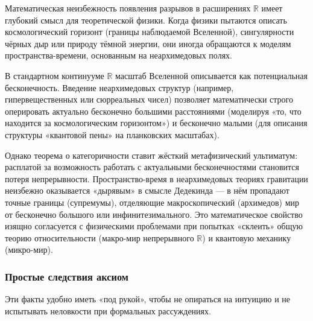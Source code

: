 \documentclass[11pt, a4paper]{extarticle}
\newcommand{\R}{{\mathbb R}}
\begin{document}
\begin{example}
    Математическая неизбежность появления разрывов в расширениях $\R$ имеет глубокий смысл для теоретической физики. Когда физики пытаются описать космологический горизонт (границы наблюдаемой Вселенной), сингулярности чёрных дыр или природу тёмной энергии, они иногда обращаются к моделям пространства-времени, основанным на неархимедовых полях. 
    
    В стандартном континууме $\R$ масштаб Вселенной описывается как потенциальная бесконечность. Введение неархимедовых структур (например, гипервещественных или сюрреальных чисел) позволяет математически строго оперировать актуально бесконечно большими расстояниями (моделируя «то, что находится за космологическим горизонтом») и бесконечно малыми (для описания структуры «квантовой пены» на планковских масштабах). 
    
    Однако теорема о категоричности ставит жёсткий метафизический ультиматум: расплатой за возможность работать с актуальными бесконечностями становится потеря непрерывности. Пространство-время в неархимедовых теориях гравитации неизбежно оказывается «дырявым» в смысле Дедекинда --- в нём пропадают точные границы (супремумы), отделяющие макроскопический (архимедов) мир от бесконечно большого или инфинитезимального. Это математическое свойство изящно согласуется с физическими проблемами при попытках «склеить» общую теорию относительности (макро-мир непрерывного $\R$) и квантовую механику (микро-мир).
\end{example}




\subsubsection{Простые следствия аксиом}


Эти факты удобно иметь «под рукой», чтобы не опираться на интуицию и не испытывать неловкости при формальных рассуждениях.
\end{document}

